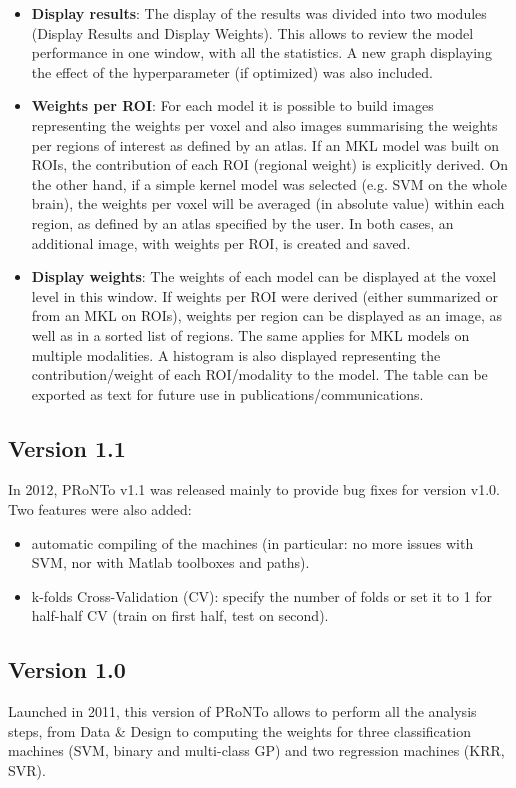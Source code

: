 \begin{itemize}
\item \textbf{Display results}: The display of the results was divided into two modules (Display Results and Display Weights). This allows to review the model performance in one window, with all the statistics. A new graph displaying the effect of the hyperparameter (if optimized) was also included.
\item \textbf{Weights per ROI}: For each model it is possible to build images representing the weights per voxel and also images summarising the weights per regions of interest as defined by an atlas. If an MKL model was built on ROIs, the contribution of each ROI (regional weight) is explicitly derived. On the other hand, if a simple kernel model was selected (e.g. SVM on the whole brain), the weights per voxel will be averaged (in absolute value) within each region, as defined by an atlas specified by the user. In both cases, an additional image, with weights per ROI, is created and saved.
\item \textbf{Display weights}: The weights of each model can be displayed at the voxel level in this window. If weights per ROI were derived (either summarized or from an MKL on ROIs), weights per region can be displayed as an image, as well as in a sorted list of regions. The same applies for MKL models on multiple modalities. A histogram is also displayed representing the contribution/weight of each ROI/modality to the model. The table can be exported as text for future use in publications/communications.
\end{itemize}

\subsection{Version 1.1}
In 2012, PRoNTo v1.1 was released mainly to provide bug fixes for version v1.0. Two features were also added:
\begin{itemize}
\item automatic compiling of the machines (in particular: no more issues with SVM, nor with Matlab toolboxes and paths).
\item k-folds Cross-Validation (CV): specify the number of folds or set it to 1 for half-half CV (train on first half, test on second).
\end{itemize}

\subsection{Version 1.0}
Launched in 2011, this version of PRoNTo allows to perform all the analysis steps, from Data \& Design to computing the weights for three classification machines (SVM, binary and multi-class GP) and two regression machines (KRR, SVR).

